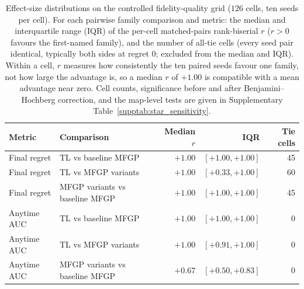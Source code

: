 \documentclass[11pt,a4paper]{article}%
\begin{document}
\begin{table}[h]
\centering
\caption{Effect-size distributions on the controlled fidelity-quality grid ($126$
cells, ten seeds per cell). For each pairwise family comparison and metric: the
median and interquartile range (IQR) of the per-cell matched-pairs rank-biserial
$r$ ($r > 0$ favours the first-named family), and the number of all-tie cells (every
seed pair identical, typically both sides at regret $0$; excluded from the median
and IQR). Within a cell, $r$ measures how consistently the ten paired seeds favour
one family, not how large the advantage is, so a median $r$ of $+1.00$ is compatible
with a mean advantage near zero. Cell counts, significance before and after
Benjamini--Hochberg correction, and the map-level tests are given in Supplementary
Table~\ref{supptab:star_sensitivity}.}
\label{supptab:grid_effect_sizes}
\begin{tabular}{llrrr}
\toprule
Metric & Comparison & Median $r$ & IQR & Tie cells \\
\midrule
Final regret & TL vs baseline MFGP & $+1.00$ & $[+1.00, +1.00]$ & 45 \\
Final regret & TL vs MFGP variants & $+1.00$ & $[+0.33, +1.00]$ & 60 \\
Final regret & MFGP variants vs baseline MFGP & $+1.00$ & $[+1.00, +1.00]$ & 45 \\
Anytime AUC & TL vs baseline MFGP & $+1.00$ & $[+1.00, +1.00]$ & 0 \\
Anytime AUC & TL vs MFGP variants & $+1.00$ & $[+0.91, +1.00]$ & 0 \\
Anytime AUC & MFGP variants vs baseline MFGP & $+0.67$ & $[+0.50, +0.83]$ & 0 \\
\bottomrule
\end{tabular}
\end{table}
\end{document}
